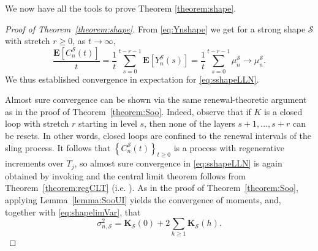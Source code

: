 \documentclass[a4paper,11pt,reqno]{amsart}
\newcommand{\bE}{\mathbf{E}}
\newcommand{\shape}{\mathscr{S}}
\newcommand{\mb}{\mathbf}
\theoremstyle{definition}
\begin{document}
We now have all the tools to prove Theorem \ref{theorem:shape}.

\begin{proof}[Proof of Theorem~\ref{theorem:shape}]
 From \eqref{eq:Ynshape} we get for a strong shape $\shape$ with stretch $r\geq 0$, as $t\to\infty$, 
 \begin{equation}\label{eq:shapeLLN1}
  \frac{\bE\left[C_n^\shape(t)\right]}{t} = \frac{1}{t}\sum_{s=0}^{t-r-1} \bE\left[Y_n^\shape(s)\right]
  = \frac{1}{t}\sum_{s=0}^{t-r-1} \mu_n^\shape \to \mu_n^\shape.
 \end{equation}
 We thus established convergence in expectation for \eqref{eq:sshapeLLN}. 

 Almost sure convergence can be shown via the same renewal-theoretic argument as in the proof of Theorem~\ref{theorem:Soo}. Indeed, observe that if $K$ is a closed loop with stretch $r$ starting in level $s$, then none of the layers $s+1,\dots,s+r$ can be resets. In other words, closed loops are confined to the renewal intervals of the sling process. It follows that $\left\{C_n^\shape(t)\right\}_{t\geq0}$ is a process with regenerative increments over $T_j$, so almost sure convergence in \eqref{eq:sshapeLLN} is again obtained by invoking \cite[Theorem 2.54]{Serfozo09} and the central limit theorem follows from Theorem~\ref{theorem:regCLT} (i.e. \cite[Theorem~2.65]{Serfozo09}). As in the proof of Theorem~\ref{theorem:Soo}, applying Lemma~\ref{lemma:SooUI} yields the convergence of  moments, and, together with \eqref{eq:shapelimVar}, that 
 \begin{equation}\label{eq:sigmashape}
  \sigma_{n,\shape}^2 = \mb K_\shape(0) + 2 \sum_{h\geq 1} \mb K_\shape(h).
 \end{equation}


\end{proof}
\end{document}
